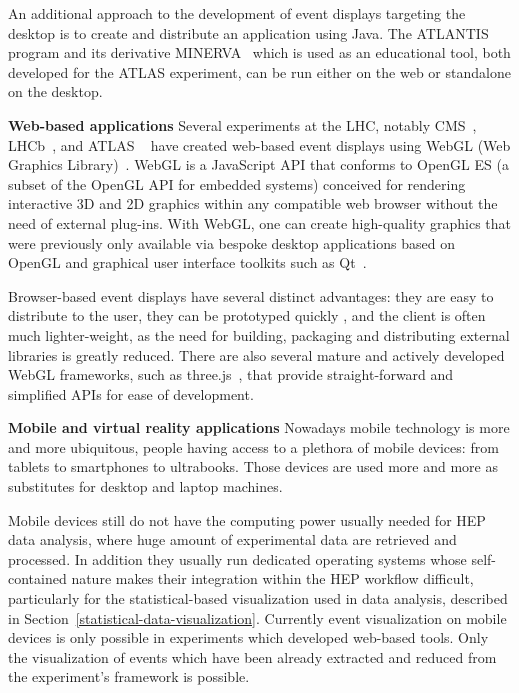 \documentclass[12pt,a4paper]{article}
\begin{document}
An additional approach to the development of event displays targeting the desktop is to create and distribute an application using Java. The ATLANTIS~\cite{ATLASAtlantis}
program and its derivative MINERVA~\cite{ATLASMinerva} which is used as an educational tool, both developed for the ATLAS experiment,
can be run either on the web or standalone on the desktop.


{\bf Web-based applications} Several experiments at the LHC, notably CMS~\cite{CMSISpyWebGL}, LHCb~\cite{LHCbOnline2014}, and ATLAS
~\cite{ATLASTada2016, ATLASTracer2015} have created web-based event displays using WebGL (Web Graphics Library)~\cite{WebGL2011}.
WebGL is a JavaScript API that conforms to OpenGL ES (a subset of the OpenGL API for embedded systems) conceived for
rendering interactive 3D and 2D graphics within any compatible web browser without the need of external plug-ins. With WebGL,
one can create high-quality graphics that were previously only available via bespoke desktop applications based on OpenGL and
graphical user interface toolkits such as Qt~\cite{QtFramework}.

Browser-based event displays have several distinct advantages: they are easy to distribute to the user, they can be prototyped quickly
, and the client is often much lighter-weight, as the need for building, packaging and distributing external libraries is greatly reduced.
There are also several mature and actively developed WebGL frameworks, such as three.js~\cite{ThreeJS}, that provide straight-forward
and simplified APIs for ease of development.


{\bf Mobile and virtual reality applications} Nowadays mobile technology is more and more ubiquitous, people having access to a plethora of mobile devices: from tablets to
smartphones to ultrabooks. Those devices are used more and more as substitutes for desktop and laptop machines.


Mobile devices still do not have the computing power usually needed for HEP data analysis, where huge amount of experimental data
are retrieved and processed. In addition they usually run dedicated operating systems whose self-contained nature
makes their integration within the HEP workflow difficult, particularly for the statistical-based visualization used in
data analysis, described in Section~\ref{statistical-data-visualization}. Currently event visualization on mobile devices is only
possible in experiments which developed web-based tools. Only the visualization of events which have been already
extracted and reduced from the experiment's framework is possible.
\end{document}
